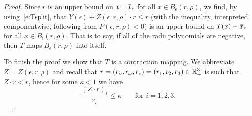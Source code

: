 \begin{proof}
%
Since $r$ is an upper bound on $x - \bar{x}_\epsilon$ for all $ x \in B_\epsilon(r,\rho)$, we find, by using~\eqref{e:Tsplit}, that  
$Y(\epsilon) + Z(\epsilon,r,\rho) \cdot r \leq r$ (with the inequality, interpreted componentwise, following from $P(\epsilon,r,\rho)<0$) is an upper bound on $T(x) - \bar{x}_\epsilon$
for all $ x \in B_\epsilon(r,\rho)$.  
That is to  say, if all of the  radii polynomials are negative, 
then  $T$ maps $B_\epsilon(r,\rho) $ into itself.

To finish the proof we show that $T$ is a contraction mapping. 
We abbreviate $Z=Z(\epsilon,r,\rho)$ and  recall that $r=(r_\alpha,r_\omega,r_c)=(r_1,r_2,r_3) \in \mathbb{R}^3_+$
is such that $Z \cdot r < r$, hence for some $\kappa <1$ we have
\begin{equation}\label{e:defkappa}
  \frac{(Z \cdot r)_i}{r_i} \leq \kappa  \qquad\text{for } i=1,2,3.
\end{equation}


\end{proof}
